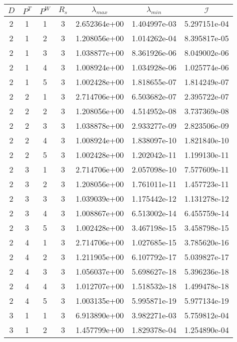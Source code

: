 \documentclass{article}
\newcommand{\cali}{\mathcal{I}}
\begin{document}
\begin{small}
\begin{table}
\begin{center}
\begin{tabular}{|cccc|ccc|} \hline
$D$ & $P^T$  & $P^W$ & $R_s$ & $\lambda_{max}$ & $\lambda_{min}$   & $\cali$ \\
  \hline
2 & 1 & 1 & 3 & 2.652364e+00 & 1.404997e-03 & 5.297151e-04 \\ 
2 & 1 & 2 & 3 & 1.208056e+00 & 1.014262e-04 & 8.395817e-05 \\ 
2 & 1 & 3 & 3 & 1.038877e+00 & 8.361926e-06 & 8.049002e-06 \\ 
2 & 1 & 4 & 3 & 1.008924e+00 & 1.034928e-06 & 1.025774e-06 \\ 
2 & 1 & 5 & 3 & 1.002428e+00 & 1.818655e-07 & 1.814249e-07 \\
\hline
2 & 2 & 1 & 3 & 2.714706e+00 & 6.503682e-07 & 2.395722e-07 \\ 
2 & 2 & 2 & 3 & 1.208056e+00 & 4.514952e-08 & 3.737369e-08 \\ 
2 & 2 & 3 & 3 & 1.038878e+00 & 2.933277e-09 & 2.823506e-09 \\ 
2 & 2 & 4 & 3 & 1.008924e+00 & 1.838097e-10 & 1.821840e-10 \\ 
2 & 2 & 5 & 3 & 1.002428e+00 & 1.202042e-11 & 1.199130e-11 \\ 
\hline
2 & 3 & 1 & 3 & 2.714706e+00 & 2.057098e-10 & 7.577609e-11 \\ 
2 & 3 & 2 & 3 & 1.208056e+00 & 1.761011e-11 & 1.457723e-11 \\ 
2 & 3 & 3 & 3 & 1.039039e+00 & 1.175442e-12 & 1.131278e-12 \\ 
2 & 3 & 4 & 3 & 1.008867e+00 & 6.513002e-14 & 6.455759e-14 \\ 
2 & 3 & 5 & 3 & 1.002428e+00 & 3.467198e-15 & 3.458798e-15 \\ 
\hline
2 & 4 & 1 & 3 & 2.714706e+00 & 1.027685e-15 & 3.785620e-16 \\   
2 & 4 & 2 & 3 & 1.211905e+00 & 6.107792e-17 & 5.039827e-17 \\ 
2 & 4 & 3 & 3 & 1.056037e+00 & 5.698627e-18 & 5.396236e-18 \\ 
2 & 4 & 4 & 3 & 1.012707e+00 & 1.518532e-18 & 1.499478e-18 \\ 
2 & 4 & 5 & 3 & 1.003135e+00 & 5.995871e-19 & 5.977134e-19 \\ 
\hline
3 & 1 & 1 & 3 & 6.913890e+00 & 3.982271e-03 & 5.759812e-04 \\ 
3 & 1 & 2 & 3 & 1.457799e+00 & 1.829378e-04 & 1.254890e-04 \\ 

\end{tabular}
\end{center}
\end{table}
\end{small}
\end{document}
